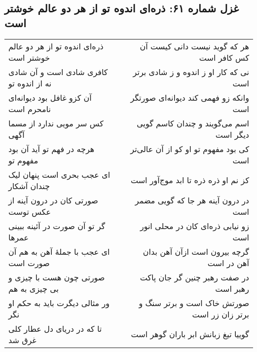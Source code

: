 \begin{center}
\section*{غزل شماره ۶۱: ذره‌ای اندوه تو از هر دو عالم خوشتر است}
\label{sec:061}
\begin{longtable}{l p{0.5cm} r}
ذره‌ای اندوه تو از هر دو عالم خوشتر است
&&
هر که گوید نیست دانی کیست آن کس کافر است
\\
کافری شادی است و آن شادی نه از اندوه تو
&&
نی که کار او ز اندوه و ز شادی برتر است
\\
آن کزو غافل بود دیوانه‌ای نامحرم است
&&
وانکه زو فهمی کند دیوانه‌ای صورتگر است
\\
کس سر مویی ندارد از مسما آگهی
&&
اسم می‌گویند و چندان کاسم گویی دیگر است
\\
هرچه در فهم تو آید آن بود مفهوم تو
&&
کی بود مفهوم تو او کو از آن عالی‌تر است
\\
ای عجب بحری است پنهان لیک چندان آشکار
&&
کز نم او ذره ذره تا ابد موج‌آور است
\\
صورتی کان در درون آینه از عکس توست
&&
در درون آینه هر جا که گویی مضمر است
\\
گر تو آن صورت در آئینه ببینی عمرها
&&
زو نیابی ذره‌ای کان در محلی انور است
\\
ای عجب با جملهٔ آهن به هم آن صورت است
&&
گرچه بیرون است ازآن آهن بدان آهن در است
\\
صورتی چون هست با چیزی و بی چیزی به هم
&&
در صفت رهبر چنین گر جان پاکت رهبر است
\\
ور مثالی دیگرت باید به حکم او نگر
&&
صورتش خاک است و برتر سنگ و برتر زان زر است
\\
تا که در دریای دل عطار کلی غرق شد
&&
گوییا تیغ زبانش ابر باران گوهر است
\\
\end{longtable}
\end{center}
